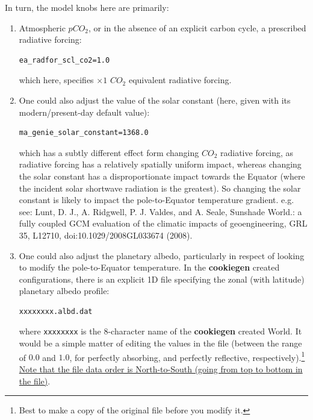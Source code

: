 \begin{enumerate}
In turn, the model knobs here are primarily:
\vspace{1mm}
\begin{enumerate}
\vspace{1mm}
\item Atmospheric \(pCO_{2}\), or in the absence of an explicit carbon cycle, a prescribed radiative forcing:
\vspace{-1mm}\small\begin{verbatim}
ea_radfor_scl_co2=1.0
\end{verbatim}\normalsize\vspace{-1mm}
which here, specifies \(\times1\) \(CO_{2}\) equivalent radiative forcing.
\vspace{1mm}
\item One could also adjust the value of the solar constant (here, given with its modern/present-day default value):
\vspace{-1mm}\small\begin{verbatim}
ma_genie_solar_constant=1368.0
\end{verbatim}\normalsize\vspace{-1mm}
which has a subtly different effect form changing \(CO_{2}\) radiative forcing, as radiative forcing has a relatively spatially uniform impact, whereas changing the solar constant has a disproportionate impact towards the Equator (where the incident solar shortwave radiation is the greatest). So changing the solar constant is likely to impact the pole-to-Equator temperature gradient. e.g. see: Lunt, D. J., A. Ridgwell, P. J. Valdes, and A. Seale, Sunshade World.: a fully coupled GCM evaluation of the climatic impacts of geoengineering, GRL 35, L12710, doi:10.1029/2008GL033674 (2008).
\vspace{1mm}
\item One could also adjust the planetary albedo, particularly in respect of looking to modify the pole-to-Equator temperature. In the \textbf{cookiegen} created configurations, there is an explicit 1D file specifying the zonal (with latitude) planetary albedo profile:
\vspace{-1mm}\small\begin{verbatim}
xxxxxxxx.albd.dat
\end{verbatim}\normalsize\vspace{-1mm}
where \texttt{xxxxxxxx} is the 8-character name of the \textbf{cookiegen} created World. It would be a simple matter of editing the values in the file (between the range of $0.0$ and $1.0$, for  perfectly absorbing, and perfectly reflective, respectively).\footnote{Best to make a copy of the original file before you modify it.} \uline{Note that the file data order is North-to-South (going from top to bottom in the file)}.
\end{enumerate}
\end{enumerate}

